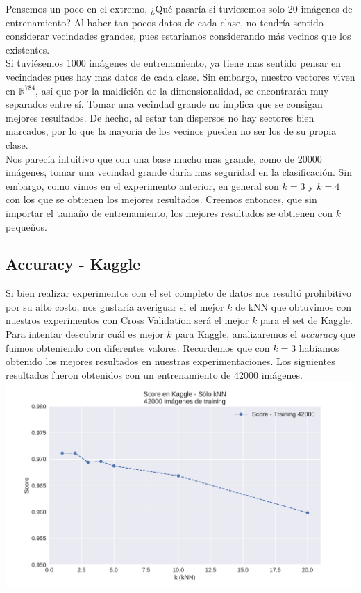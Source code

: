 Pensemos un poco en el extremo, ¿Qué pasaría si tuviesemos solo 20 imágenes de entrenamiento? Al haber tan pocos datos de cada clase, no tendría sentido considerar vecindades grandes, pues estaríamos considerando más vecinos que los existentes. \\

Si tuviésemos 1000 imágenes de entrenamiento, ya tiene mas sentido pensar en vecindades pues hay mas datos de cada clase. Sin embargo, nuestro vectores viven en $\mathbb{R}^{784}$, así que por la maldición de la dimensionalidad, se encontrarán muy separados entre sí. Tomar una vecindad grande no implica que se consigan mejores resultados. De hecho, al estar tan dispersos no hay sectores bien marcados, por lo que la mayoria de los vecinos pueden no ser los de su propia clase. \\

Nos parecía intuitivo que con una base mucho mas grande, como de 20000 imágenes, tomar una vecindad grande daría mas seguridad en la clasificación. Sin embargo, como vimos en el experimento anterior, en general son $k=3$ y $k=4$ con los que se obtienen los mejores resultados. Creemos entonces, que sin importar el tamaño de entrenamiento, los mejores resultados se obtienen con $k$ pequeños. \\


\newpage
\subsection{Accuracy - Kaggle}

Si bien realizar experimentos con el set completo de datos nos resultó prohibitivo por su alto costo, nos gustaría averiguar si el mejor $k$ de kNN que obtuvimos con nuestros experimentos con Cross Validation será el mejor $k$ para el set de Kaggle. Para intentar descubrir cuál es mejor $k$ para Kaggle, analizaremos el \textit{accuracy} que fuimos obteniendo con diferentes valores. Recordemos que con $k = 3$ habíamos obtenido los mejores resultados en nuestras experimentaciones. Los siguientes resultados fueron obtenidos con un entrenamiento de 42000 imágenes. \\

{\centering
    \includegraphics[scale=0.60]{informe/imagenes/knn/kaggleknnREENTREGA.pdf} \\
}
$ $\newline

